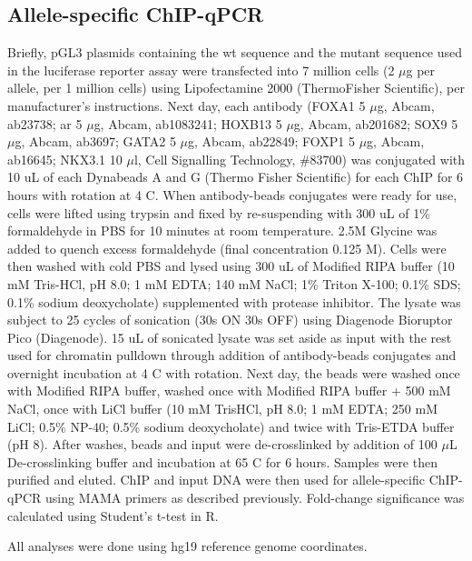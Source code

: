 \subsection{Allele-specific ChIP-qPCR}

Briefly, pGL3 plasmids containing the \gls{wt} sequence and the mutant sequence used in the luciferase reporter assay were transfected into 7 million cells (2 $\mu$g per allele, per 1 million cells) using Lipofectamine 2000 (ThermoFisher Scientific), per manufacturer's instructions.
Next day, each antibody (FOXA1 5 $\mu$g, Abcam, ab23738; \gls{ar} 5 $\mu$g, Abcam, ab1083241; HOXB13 5 $\mu$g, Abcam, ab201682; SOX9 5 $\mu$g, Abcam, ab3697; GATA2 5 $\mu$g, Abcam, ab22849; FOXP1 5 $\mu$g, Abcam, ab16645; NKX3.1 10 $\mu$l, Cell Signalling Technology, \#83700) was conjugated with 10 uL of each Dynabeads A and G (Thermo Fisher Scientific) for each ChIP for 6 hours with rotation at 4 \textdegree C.
When antibody-beads conjugates were ready for use, cells were lifted using trypsin and fixed by re-suspending with 300 uL of 1\% formaldehyde in PBS for 10 minutes at room temperature.
2.5M Glycine was added to quench excess formaldehyde (final concentration 0.125 M).
Cells were then washed with cold PBS and lysed using 300 uL of Modified RIPA buffer (10 mM Tris-HCl, pH 8.0; 1 mM EDTA; 140 mM NaCl; 1\% Triton X-100; 0.1\% SDS; 0.1\% sodium deoxycholate) supplemented with protease inhibitor.
The lysate was subject to 25 cycles of sonication (30s ON 30s OFF) using Diagenode Bioruptor Pico (Diagenode).
15 uL of sonicated lysate was set aside as input with the rest used for chromatin pulldown through addition of antibody-beads conjugates and overnight incubation at 4 \textdegree C with rotation.
Next day, the beads were washed once with Modified RIPA buffer, washed once with Modified RIPA buffer + 500 mM NaCl, once with LiCl buffer (10 mM TrisHCl, pH 8.0; 1 mM EDTA; 250 mM LiCl; 0.5\% NP-40; 0.5\% sodium deoxycholate) and twice with Tris-ETDA buffer (pH 8).
After washes, beads and input were de-crosslinked by addition of 100 $\mu$L De-crosslinking buffer and incubation at 65 \textdegree C for 6 hours.
Samples were then purified and eluted.
ChIP and input DNA were then used for allele-specific ChIP-qPCR using MAMA primers as described previously.
Fold-change significance was calculated using Student's t-test in R.

All analyses were done using hg19 reference genome coordinates.
